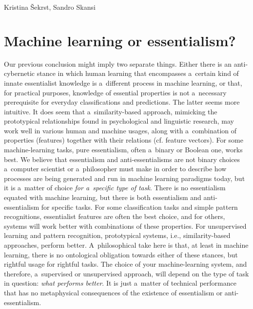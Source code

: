 \begin{artengenv2auth}{Kristina Šekrst, Sandro Skansi}
\section{Machine learning or essentialism?}
Our previous conclusion might imply two separate things. Either there is an anti-cybernetic stance in which human learning that encompasses a~certain kind of innate essentialist knowledge is a~different process in machine learning, or that, for practical purposes, knowledge of essential properties is not a~necessary prerequisite for everyday classifications and predictions. The latter seems more intuitive. It does seem that a~similarity-based approach, mimicking the prototypical relationships found in psychological and linguistic research, may work well in various human and machine usages, along with a~combination of properties (features) together with their relations (cf. feature vectors). For some machine-learning tasks, pure essentialism, often a~binary or Boolean one, works best. We believe that essentialism and anti-essentialisms are not binary choices a~computer scientist or a~philosopher must make in order to describe how processes are being generated and run in machine learning paradigms today, but it is a~matter of choice \textit{for a~specific type of task}. There is no essentialism equated with machine learning, but there is both essentialism and anti-essentialism for specific tasks. For some classification tasks and simple pattern recognitions, essentialist features are often the best choice, and for others, systems will work better with combinations of these properties. For unsupervised learning and pattern recognition, prototypical systems, i.e., similarity-based approaches, perform better. A~philosophical take here is that, at least in machine learning, there is no ontological obligation towards either of these stances, but rightful usage for rightful tasks. The choice of your machine-learning system, and therefore, a~supervised or unsupervised approach, will depend on the type of task in question: \textit{what performs better}. It is just a~matter of technical performance that has no metaphysical consequences of the existence of essentialism or anti-essentialism.


\end{artengenv2auth}
